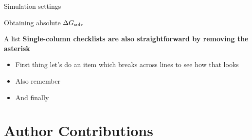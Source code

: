 \documentclass[9pt,tutorial]{livecoms}
\begin{document}
\begin{Checklists}

\begin{checklist}{Simulation settings}
\end{checklist}

\begin{checklist}{Obtaining absolute $\Delta G_\textup{solv}$ }
\end{checklist}

\begin{checklist}{A list}
\textbf{Single-column checklists are also straightforward by removing the asterisk}
\begin{itemize}
\item First thing let's do an item which breaks across lines to see how that looks
\item Also remember
\item And finally
\end{itemize}
\end{checklist}
%

\end{Checklists}








\section*{Author Contributions}
%
\end{document}
